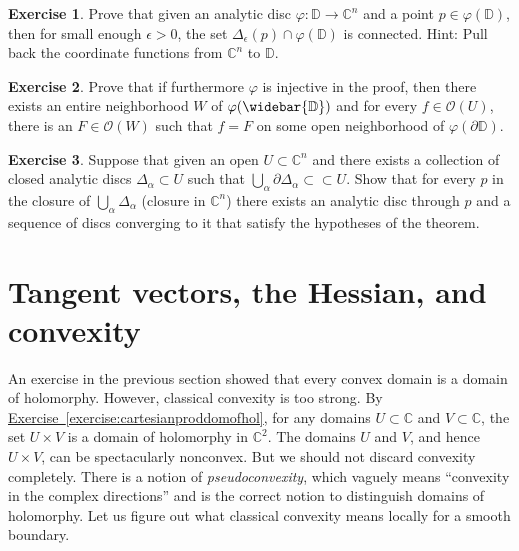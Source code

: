 \documentclass[12pt,openany]{book}
\newcommand{\C}{{\mathbb{C}}}
\newcommand{\D}{{\mathbb{D}}}
\newcommand{\sO}{{\mathscr{O}}}
\theoremstyle{plain}
\theoremstyle{remark}
\theoremstyle{definition}
\newenvironment{exbox}{%
    \def\FrameCommand{\vrule width 1pt \relax\hspace{10pt}}%
    \MakeFramed{\advance\hsize-\width\FrameRestore}%
}{%
    \endMakeFramed
}
\theoremstyle{exercise}
\newtheorem{exercise}{Exercise}[section]
\theoremstyle{example}
\newcommand{\exerciseref}[1]{\hyperref[#1]{Exercise~\ref*{#1}}}
\begin{document}
\begin{exbox}
\begin{exercise}
Prove that given an analytic disc $\varphi \colon \D \to \C^n$ and a point
$p \in \varphi(\D)$, then for small enough $\epsilon > 0$, the set
$\Delta_\epsilon(p) \cap \varphi(\D)$ is connected.  Hint: Pull back the
coordinate functions from $\C^n$ to $\D$.
\end{exercise}

\begin{exercise}
Prove that if furthermore $\varphi$ is injective in the proof,
then there exists an entire neighborhood $W$ of $\varphi(\widebar{\D})$
and for every $f \in \sO(U)$, there is an $F \in \sO(W)$ such that 
$f=F$ on some open neighborhood of $\varphi(\partial \D)$.
\end{exercise}

\begin{exercise}
Suppose that given an open $U \subset \C^n$
and there exists a collection of
closed analytic discs $\Delta_\alpha \subset U$
such that $\bigcup_\alpha \partial \Delta_\alpha \subset \subset U$.
Show that for every $p$ in the closure of $\bigcup_\alpha \Delta_\alpha$
(closure in $\C^n$) there exists an analytic disc through $p$ and a sequence
of discs converging to it that satisfy the hypotheses of the theorem.
\end{exercise}
\end{exbox}


\section{Tangent vectors, the Hessian, and convexity}

An exercise in the previous section showed that every convex domain is a
domain of holomorphy.  However, classical convexity is too strong.
By \exerciseref{exercise:cartesianproddomofhol},
for any domains $U \subset \C$ and $V \subset \C$, the set
$U \times V$ is a domain of holomorphy in $\C^2$.  The domains
$U$ and $V$, and hence $U \times V$, can be spectacularly nonconvex.
But we should not discard convexity completely.
There is a notion of
\emph{pseudoconvexity}, which vaguely means ``convexity in the
complex directions'' and is the correct notion to distinguish
domains of holomorphy.
Let us figure out what classical convexity means locally for a smooth boundary.
\end{document}
